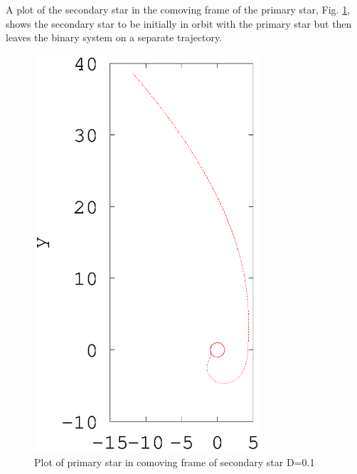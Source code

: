 \documentclass[a4paper,12pt]{article}
\begin{document}
A plot of the secondary star in the comoving frame of the primary star, Fig. \ref{fig:problem3_5}, shows the secondary star to be initially in orbit with the primary star but then leaves the binary system on a separate trajectory.
\begin{figure}[H]
\centering
\includegraphics[width=0.75\textwidth]{./problem3/problem3_5}
\caption{Plot of primary star in comoving frame of secondary star D=0.1}
\label{fig:problem3_5}
\end{figure}
\end{document}
